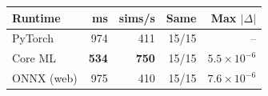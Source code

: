 \begin{tabular}{@{}lrrrr@{}}
\toprule
Runtime & ms & sims/s & Same & Max $|\Delta|$ \\
\midrule
PyTorch & 974 & 411 & 15/15 & -- \\
Core ML & \textbf{534} & \textbf{750} & 15/15 & $5.5\times10^{-6}$ \\
ONNX (web) & 975 & 410 & 15/15 & $7.6\times10^{-6}$ \\
\bottomrule
\end{tabular}
